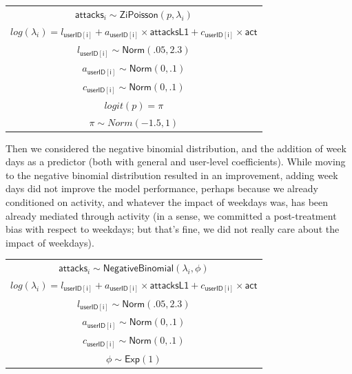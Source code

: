 \documentclass[preprint,12pt]{elsarticle}
\begin{document}
\footnotesize


\begin{center}
\begin{tabular}{c}
$\mathsf{attacks}_i   \sim  \textsf{ZiPoisson}(p, \lambda_i)$\\ 
$    log(\lambda_i)    =  l_{\mathsf{userID[i]}} + a_{\mathsf{userID[i]}}  \times \mathsf{attacksL1} + c_{\mathsf{userID[i]}}  \times \mathsf{act}$\\ 
$    l_{\mathsf{userID[i]}}   \sim  \textsf{Norm}(.05,2.3)$\\
$    a_{\mathsf{userID[i]}}   \sim \textsf{Norm}(0,.1)$\\
$    c_{\mathsf{userID[i]}}   \sim  \textsf{Norm}(0,.1) $\\
$    logit(p)   = \pi$\\
$    \pi   \sim Norm(-1.5,1) $
\end{tabular}
\end{center}

\normalsize


Then we considered the negative binomial distribution, and the addition
of week days as a predictor (both with general and user-level
coefficients). While moving to the negative binomial distribution
resulted in an improvement, adding week days did not improve the model
performance, perhaps because we already conditioned on activity, and
whatever the impact of weekdays was, has been already mediated through
activity (in a sense, we committed a post-treatment bias with respect to
weekdays; but that's fine, we did not really care about the impact of
weekdays).


\footnotesize


\begin{center}
\begin{tabular}{c}
$\mathsf{attacks}_i   \sim  \textsf{NegativeBinomial}(\lambda_i, \phi)$\\ 
$    log(\lambda_i)    =  l_{\mathsf{userID[i]}} + a_{\mathsf{userID[i]}}  \times \mathsf{attacksL1} + c_{\mathsf{userID[i]}}  \times \mathsf{act}$\\ 
$    l_{\mathsf{userID[i]}}   \sim  \textsf{Norm}(.05,2.3)$\\
$    a_{\mathsf{userID[i]}}   \sim \textsf{Norm}(0,.1)$\\
$    c_{\mathsf{userID[i]}}   \sim  \textsf{Norm}(0,.1) $\\
$    \phi  \sim \mathsf{Exp}(1)$\\
\end{tabular}
\end{center}
\end{document}
